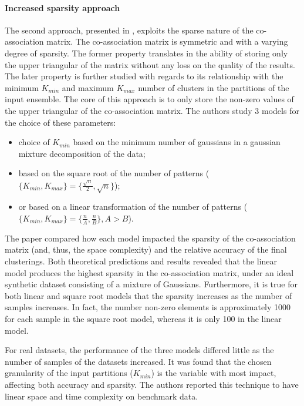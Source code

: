 \paragraph{Increased sparsity approach}
The second approach, presented in \cite{Lourenco2010}, exploits the sparse nature of the co-association matrix. The co-association matrix is symmetric and with a varying degree of sparsity. The former property translates in the ability of storing only the upper triangular of the matrix without any loss on the quality of the results. The later property is further studied with regards to its relationship with the minimum $K_{min}$ and maximum $K_{max}$ number of clusters in the partitions of the input ensemble. The core of this approach is to only store the non-zero values of the upper triangular of the co-association matrix. The authors study 3 models for the choice of these parameters:

\begin{itemize}
	\item choice of $K_{min}$ based on the minimum number of gaussians in a gaussian mixture decomposition of the data;
	\item based on the square root of the number of patterns ($\{K_{min},K_{max}\} = \{\frac{\sqrt{n}}{2},\sqrt{n}\}$);
	\item or based on a linear transformation of the number of patterns ($\{K_{min},K_{max}\} = \{\frac{n}{A},\frac{n}{B}\},A>B$).
\end{itemize}

The paper compared how each model impacted the sparsity of the co-association matrix (and, thus, the space complexity) and the relative accuracy of the final clusterings. Both theoretical predictions and results revealed that the linear model produces the highest sparsity in the co-association matrix, under an ideal synthetic dataset consisting of a mixture of Gaussians. Furthermore, it is true for both linear and square root models that the sparsity increases as the number of samples increases. In fact, the number non-zero elements is approximately 1000 for each sample in the square root model, whereas it is only 100 in the linear model.

For real datasets, the performance of the three models differed little as the number of samples of the datasets increased. It was found that the chosen granularity of the input partitions ($K_{min}$) is the variable with most impact, affecting both accuracy and sparsity. The authors reported this technique to have linear space and time complexity on benchmark data.

